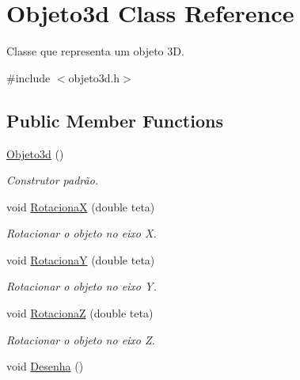 \hypertarget{class_objeto3d}{\section{Objeto3d Class Reference}
\label{class_objeto3d}
}


Classe que representa um objeto 3\+D.  




{\ttfamily \#include $<$objeto3d.\+h$>$}

\subsection*{Public Member Functions}
\begin{DoxyCompactItemize}
\item 
\hypertarget{class_objeto3d_af272029a83c257f9e89c9bfaba63896e}{\hyperlink{class_objeto3d_af272029a83c257f9e89c9bfaba63896e}{Objeto3d} ()}\label{class_objeto3d_af272029a83c257f9e89c9bfaba63896e}

\begin{DoxyCompactList}\small\item\em Construtor padrão. \end{DoxyCompactList}\item 
void \hyperlink{class_objeto3d_a22b95eda6eaa614054414960bba71975}{Rotaciona\+X} (double teta)
\begin{DoxyCompactList}\small\item\em Rotacionar o objeto no eixo X. \end{DoxyCompactList}\item 
void \hyperlink{class_objeto3d_abc3677a4f2f11189e5a5e0c20c58afbf}{Rotaciona\+Y} (double teta)
\begin{DoxyCompactList}\small\item\em Rotacionar o objeto no eixo Y. \end{DoxyCompactList}\item 
void \hyperlink{class_objeto3d_aa6b3be158f45ff94c2ba9edebfcdef75}{Rotaciona\+Z} (double teta)
\begin{DoxyCompactList}\small\item\em Rotacionar o objeto no eixo Z. \end{DoxyCompactList}\item 
\hypertarget{class_objeto3d_af2a8eb55a37b7433c81805967d84e101}{void \hyperlink{class_objeto3d_af2a8eb55a37b7433c81805967d84e101}{Desenha} ()}\label{class_objeto3d_af2a8eb55a37b7433c81805967d84e101}


\end{DoxyCompactItemize}
